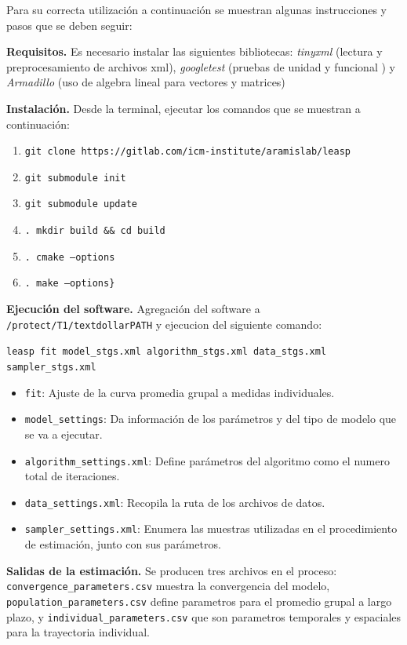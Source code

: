 \documentclass[12pt]{article}
\begin{document}
Para su correcta utilización a continuación se muestran algunas instrucciones y
pasos que se deben seguir:

\begin{description}
	\item {\textbf{Requisitos.}} Es necesario instalar las siguientes bibliotecas:
	\textit{tinyxml} (lectura y preprocesamiento de archivos xml),
	\textit{googletest} (pruebas de unidad y funcional ) y  \textit{Armadillo} (uso
	de algebra lineal para vectores y matrices) 
	
	\item {\textbf{Instalación.}} Desde la terminal, ejecutar los comandos que se
	muestran a continuación:
	\begin{enumerate}
		\item \texttt{git clone https://gitlab.com/icm-institute/aramislab/leasp}
		\item \texttt{git submodule init}
		\item \texttt{git submodule update}
		\item \texttt{. mkdir build \&\& cd build}
		\item \texttt{. cmake --options}
		\item \texttt{. make --options\}}
	\end{enumerate}
	
	\item {\textbf{Ejecución del software.}} Agregación del software a
	\texttt{/protect/T1/textdollarPATH} y ejecucion del siguiente comando:
	\begin{center}
		\texttt{leasp fit model\_stgs.xml algorithm\_stgs.xml data\_stgs.xml sampler\_stgs.xml}
	\end{center}
	
	\begin{itemize}
		\item \texttt{fit}: Ajuste de la curva promedia grupal a medidas individuales.
		\item \texttt{model\_settings}: Da información de los parámetros y del tipo de modelo	que se va a ejecutar.
		\item \texttt{algorithm\_settings.xml}: Define parámetros del algoritmo como el numero total de iteraciones.
		\item \texttt{data\_settings.xml}: Recopila la ruta de los archivos de datos.
		\item \texttt{sampler\_settings.xml}: Enumera las muestras utilizadas en el procedimiento de estimación, junto con sus parámetros.
	\end{itemize}
	
	\item {\textbf{Salidas de la estimación.}} Se producen tres archivos en el proceso: \texttt{convergence\_parameters.csv} muestra la convergencia del modelo, \texttt{population\_parameters.csv} define parametros para el promedio grupal a largo plazo, y \texttt{individual\_parameters.csv} que son parametros temporales y espaciales para la trayectoria individual.
\end{description}
\end{document}
